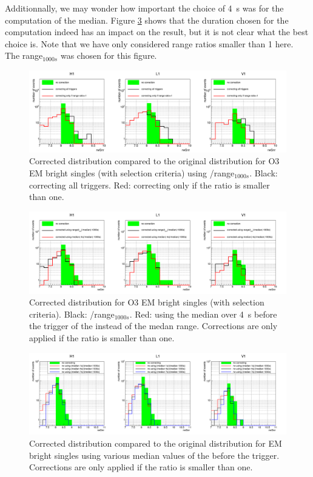 Additionnally, we may wonder how important the choice of \SI{4}{s} was for the computation of the median.
Figure \ref{fig:reweightBright} shows that the duration chosen for the computation indeed has an impact on the result, but it is not clear what the best choice is.
Note that we have only considered range ratios smaller than 1 here.
The range$_{1000s}$ was chosen for this figure.
\begin{figure}[H]
  \centering
  \includegraphics[width=\linewidth]{sectionBadTriggers/PSD/Reweight/cThese1_bright.png}
  \caption{Corrected distribution compared to the original distribution for O3 EM bright singles (with selection criteria) using \medr{}/range$_{1000s}$. Black: correcting all triggers. Red: correcting only if the ratio is smaller than one.}
  \label{fig:reweightBrightInstant}
\end{figure}
%
\begin{figure}[H]
  \centering
  \includegraphics[width=\linewidth]{sectionBadTriggers/PSD/Reweight/cThese2_bright.png}
  \caption{Corrected distribution for O3 EM bright singles (with selection criteria). Black: \medr{}/range$_{1000s}$. Red: using the median over \SI{4}{s} before the trigger of the \medr{} instead of the medan range. Corrections are only applied if the ratio is smaller than one.}
  \label{fig:reweightBright_b}
\end{figure}
%
\begin{figure}[H]
  \centering
  \includegraphics[width=\linewidth]{sectionBadTriggers/PSD/Reweight/cReweightBright.png}
  \caption{Corrected distribution compared to the original distribution for EM bright singles using various median values of the \medr{} before the trigger. Corrections are only applied if the ratio is smaller than one.}
  \label{fig:reweightBright}
\end{figure}

